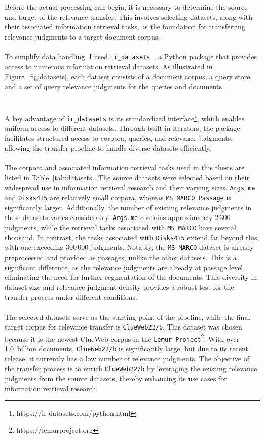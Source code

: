 Before the actual processing can begin, it is necessary to determine the source and target of the relevance transfer. This involves selecting datasets, along with their associated information retrieval tasks, as the foundation for transferring relevance judgments to a target document corpus.
\\\\
To simplify data handling, I used \texttt{ir\_datasets}~\citep{macavaney:2021}, a Python package that provides access to numerous information retrieval datasets. As illustrated in Figure~\ref{fig:datasets}, each dataset consists of a document corpus, a query store, and a set of query relevance judgments for the queries and documents.
\\\\\\
A key advantage of \texttt{ir\_datasets} is its standardized interface\footnote{https://ir-datasets.com/python.html}, which enables uniform access to different datasets. Through built-in iterators, the package facilitates structured access to corpora, queries, and relevance judgments, allowing the transfer pipeline to handle diverse datasets efficiently.
\\\\
The corpora and associated information retrieval tasks used in this thesis are listed in Table~\ref{tab:datasets}. The source datasets were selected based on their widespread use in information retrieval research and their varying sizes. \texttt{Args.me} and \texttt{Disks4+5} are relatively small corpora, whereas \texttt{MS MARCO Passage} is significantly larger. Additionally, the number of existing relevance judgments in these datasets varies considerably. \texttt{Args.me} contains approximately $2\,300$ judgments, while the retrieval tasks associated with \texttt{MS MARCO} have several thousand. In contrast, the tasks associated with \texttt{Disks4+5} extend far beyond this, with one exceeding $300\,000$ judgments. Notably, the \texttt{MS MARCO} dataset is already preprocessed and provided as passages, unlike the other datasets. This is a significant difference, as the relevance judgments are already at passage level, eliminating the need for further segmentation of the documents. This diversity in dataset size and relevance judgment density provides a robust test for the transfer process under different conditions.
\\\\
The selected datasets serve as the starting point of the pipeline, while the final target corpus for relevance transfer is \texttt{ClueWeb22/b}. This dataset was chosen because it is the newest ClueWeb corpus in the \texttt{Lemur Project}\footnote{https://lemurproject.org}. With over 1.0~billion documents, \texttt{ClueWeb22/b} is significantly large, but due to its recent release, it currently has a low number of relevance judgments. The objective of the transfer process is to enrich \texttt{ClueWeb22/b} by leveraging the existing relevance judgments from the source datasets, thereby enhancing its use cases for information retrieval research.
\pagebreak


